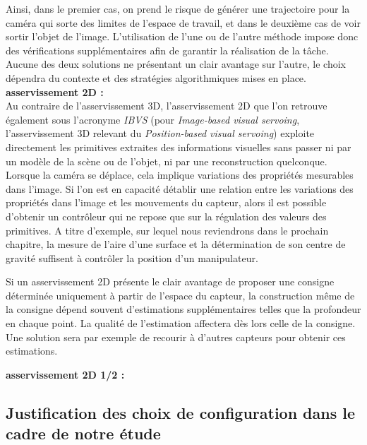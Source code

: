 Ainsi, dans le premier cas, on prend le risque de g\'en\'erer une trajectoire pour la cam\'era qui sorte des limites de l'espace de travail, et dans le deuxi\`eme cas de voir sortir l'objet de l'image. L'utilisation de l'une ou de l'autre m\'ethode impose donc des v\'erifications suppl\'ementaires afin de garantir la r\'ealisation de la t\^ache. Aucune des deux solutions ne pr\'esentant un clair avantage sur l'autre, le choix d\'ependra du contexte et des strat\'egies algorithmiques mises en place.\\

{\bf asservissement 2D :} \\

Au contraire de l'asservissement 3D, l'asservissement 2D que l'on retrouve \'egalement sous l'acronyme {\it IBVS} (pour {\it Image-based visual servoing}, l'asservissement 3D relevant du {\it Position-based visual servoing}) exploite directement les primitives extraites des informations visuelles sans passer ni par un mod\`ele de la sc\`ene ou de l'objet, ni par une reconstruction quelconque. Lorsque la cam\'era se d\'eplace, cela implique variations des propri\'et\'es mesurables dans l'image. Si l'on est en capacit\'e d\'etablir une relation entre les variations des propri\'et\'es dans l'image et les mouvements du capteur, alors il est possible d'obtenir un contr\^oleur qui ne repose que sur la r\'egulation des valeurs des primitives. A titre d'exemple, sur lequel nous reviendrons dans le prochain chapitre, la mesure de l'aire d'une surface et la d\'etermination de son centre de gravit\'e suffisent \`a contr\^oler la position d'un manipulateur.

Si un asservissement 2D pr\'esente le clair avantage de proposer une consigne d\'etermin\'ee uniquement \`a partir de l'espace du capteur, la construction m\^eme de la consigne d\'epend souvent d'estimations suppl\'ementaires telles que la profondeur en chaque point. La qualit\'e de l'estimation affectera d\`es lors celle de la consigne. Une solution sera par exemple de recourir \`a d'autres capteurs pour obtenir ces estimations. 

{\bf asservissement 2D 1/2 :}\\




\subsection{Justification des choix de configuration dans le cadre de notre \'etude}\label{chap1-1-2}

